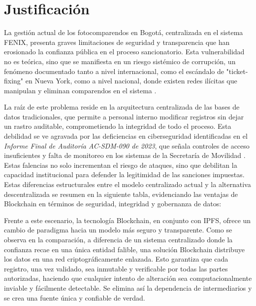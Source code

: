 \section{\large Justificación}
La gestión actual de los fotocomparendos en Bogotá, centralizada en el sistema FENIX, presenta graves limitaciones de seguridad y transparencia que han erosionado la confianza pública en el proceso sancionatorio. Esta vulnerabilidad no es teórica, sino que se manifiesta en un riesgo sistémico de corrupción, un fenómeno documentado tanto a nivel internacional, como el escándalo de "ticket-fixing" en Nueva York, como a nivel nacional, donde existen redes ilícitas que manipulan y eliminan comparendos en el sistema \parencite{barbaro2011ticketfixing, blogAletta, procuraduriaBucaramanga}.

La raíz de este problema reside en la arquitectura centralizada de las bases de datos tradicionales, que permite a personal interno modificar registros sin dejar un rastro auditable, comprometiendo la integridad de todo el proceso. Esta debilidad se ve agravada por las deficiencias en ciberseguridad identificadas en el \textit{Informe Final de Auditoría AC-SDM-090 de 2023}, que señala controles de acceso insuficientes y falta de monitoreo en los sistemas de la Secretaría de Movilidad \parencite{auditoriaSDM}. Estas falencias no solo incrementan el riesgo de ataques, sino que debilitan la capacidad institucional para defender la legitimidad de las sanciones impuestas.
Estas diferencias estructurales entre el modelo centralizado actual y la alternativa descentralizada se resumen en la siguiente tabla, evidenciando las ventajas de Blockchain en términos de seguridad, integridad y gobernanza de datos:



Frente a este escenario, la tecnología Blockchain, en conjunto con IPFS, ofrece un cambio de paradigma hacia un modelo más seguro y transparente. Como se observa en la comparación, a diferencia de un sistema centralizado donde la confianza recae en una única entidad falible, una solución Blockchain distribuye los datos en una red criptográficamente enlazada. Esto garantiza que cada registro, una vez validado, sea inmutable y verificable por todas las partes autorizadas, haciendo que cualquier intento de alteración sea computacionalmente inviable y fácilmente detectable. Se elimina así la dependencia de intermediarios y se crea una fuente única y confiable de verdad.

